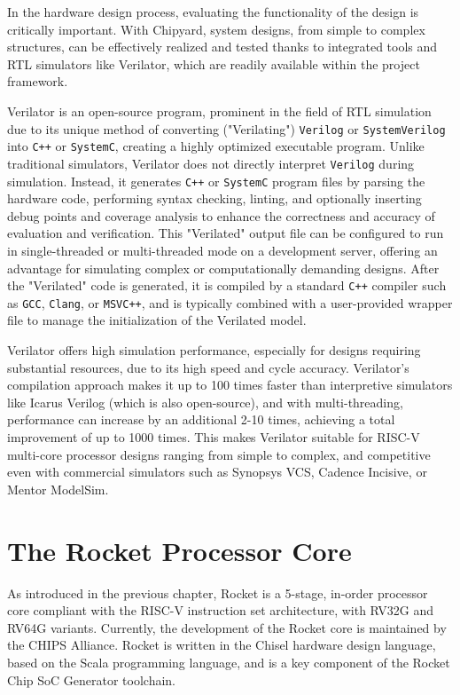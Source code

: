In the hardware design process, evaluating the functionality of the design is critically important. With Chipyard, system designs, from simple to complex structures, can be effectively realized and tested thanks to integrated tools and RTL simulators like Verilator, which are readily available within the project framework.

Verilator is an open-source program, prominent in the field of RTL simulation due to its unique method of converting ("Verilating") \texttt{Verilog} or \texttt{SystemVerilog} into \texttt{C++} or \texttt{SystemC}, creating a highly optimized executable program. Unlike traditional simulators, Verilator does not directly interpret \texttt{Verilog} during simulation. Instead, it generates \texttt{C++} or \texttt{SystemC} program files by parsing the hardware code, performing syntax checking, linting, and optionally inserting debug points and coverage analysis to enhance the correctness and accuracy of evaluation and verification. This "Verilated" output file can be configured to run in single-threaded or multi-threaded mode on a development server, offering an advantage for simulating complex or computationally demanding designs. After the "Verilated" code is generated, it is compiled by a standard \texttt{C++} compiler such as \texttt{GCC}, \texttt{Clang}, or \texttt{MSVC++}, and is typically combined with a user-provided wrapper file to manage the initialization of the Verilated model.

Verilator offers high simulation performance, especially for designs requiring substantial resources, due to its high speed and cycle accuracy. Verilator's compilation approach makes it up to 100 times faster than interpretive simulators like Icarus Verilog (which is also open-source), and with multi-threading, performance can increase by an additional 2-10 times, achieving a total improvement of up to 1000 times. This makes Verilator suitable for RISC-V multi-core processor designs ranging from simple to complex, and competitive even with commercial simulators such as Synopsys VCS, Cadence Incisive, or Mentor ModelSim.

\section{The Rocket Processor Core}
\label{sec:rocket_core}

As introduced in the previous chapter, Rocket is a 5-stage, in-order processor core compliant with the RISC-V instruction set architecture, with RV32G and RV64G variants. Currently, the development of the Rocket core is maintained by the CHIPS Alliance. Rocket is written in the Chisel hardware design language, based on the Scala programming language, and is a key component of the Rocket Chip SoC Generator toolchain.

